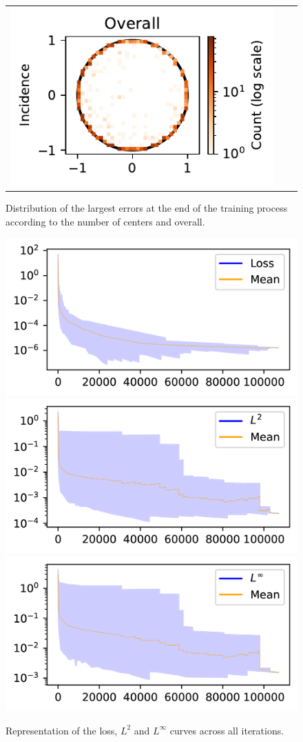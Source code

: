 \documentclass[12pt]{report} %
\begin{document}
\begin{figure}[h]
\begin{tabular}{ccc}
    \includegraphics[width=.4\textwidth]{imagenes/experiments/2d/pde_parabola/distribution_of_errors_L_inf_end.pdf}
  \end{tabular}
  \caption{Distribution of the largest errors at the end of the training process according to the number of centers and overall.}
  \label{fig:2d-pde-results-largest-errors}
\end{figure}


\begin{figure}[h]
  \includegraphics[width=.7\textwidth]{imagenes/experiments/2d/pde_parabola/Loss_curves_semilogy_all.png}
  \includegraphics[width=.7\textwidth]{imagenes/experiments/2d/pde_parabola/L2_curves_semilogy_all.png}
  \includegraphics[width=.7\textwidth]{imagenes/experiments/2d/pde_parabola/Linf_curves_semilogy_all.png}
  \caption{Representation of the loss, $L^2$ and $L^\infty$ curves across all iterations.}
  \label{fig:2d-pde-results-last-iterations}
\end{figure}
\end{document}
